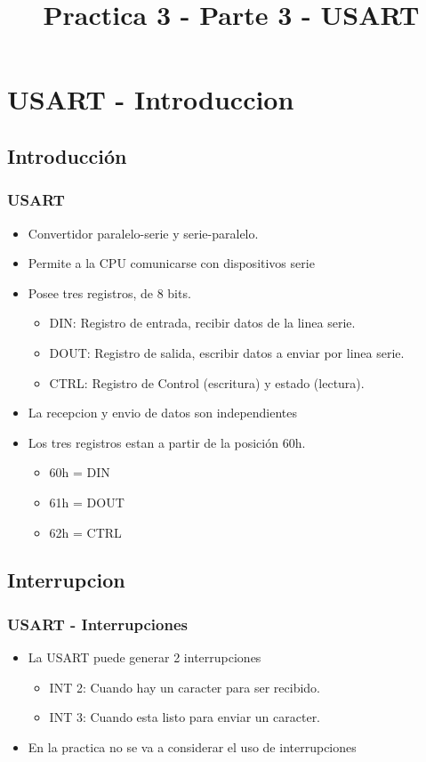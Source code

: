 \documentclass{beamer}
\title{Practica 3 - Parte 3 - USART}
\begin{document}
\begin{frame}
\titlepage
\end{frame}

\section{USART - Introduccion}
\subsection{Introducción}
\begin{frame}
\frametitle{USART}
\begin{itemize}
 \item Convertidor paralelo-serie y serie-paralelo.
 \item Permite a la CPU comunicarse con dispositivos serie
 \item Posee tres registros, de 8 bits.
  \begin{itemize}
   \item DIN: Registro de entrada, recibir datos de la linea serie.
   \item DOUT: Registro de salida, escribir datos a enviar por linea serie.
   \item CTRL: Registro de Control (escritura) y estado (lectura).
  \end{itemize}
 \item La recepcion y envio de datos son independientes
 \item Los tres registros estan a partir de la posición 60h. 
  \begin{itemize}
      \item 60h = DIN
      \item 61h = DOUT
      \item 62h = CTRL
\end{itemize}
\end{itemize}
\end{frame}

\subsection{Interrupcion}
\begin{frame}
\frametitle{USART - Interrupciones}
\begin{itemize}
 \item La USART puede generar 2 interrupciones
  \begin{itemize}
   \item INT 2: Cuando hay un caracter para ser recibido.
   \item INT 3: Cuando esta listo para enviar un caracter.
  \end{itemize}
  \item En la practica no se va a considerar el uso de interrupciones
\end{itemize}
\end{frame}
\end{document}
